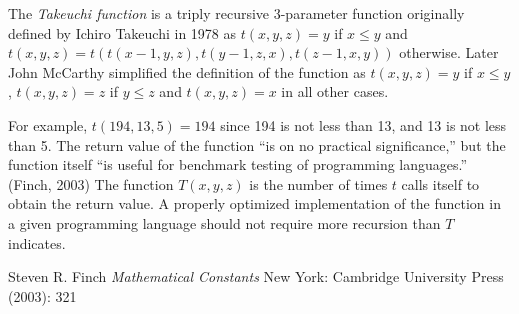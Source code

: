 \documentclass[12pt]{article}
\begin{document}
The {\em Takeuchi function} is a triply recursive 3-parameter function originally defined by Ichiro Takeuchi in 1978 as $t(x, y, z) = y$ if $x \leq y$ and $t(x, y, z) = t(t(x - 1, y, z), t(y - 1, z, x), t(z - 1, x, y))$ otherwise. Later John McCarthy simplified the definition of the function as $t(x, y, z) = y$ if $x \leq y$, $t(x, y, z) = z$ if $y \leq z$ and $t(x, y, z) = x$ in all other cases.

For example, $t(194, 13, 5) = 194$ since 194 is not less than 13, and 13 is not less than 5. The return value of the function ``is on no practical significance,'' but the function itself ``is useful for benchmark testing of programming languages.'' (Finch, 2003) The function $T(x, y, z)$ is the number of times $t$ calls itself to obtain the return value. A properly optimized implementation of the function in a given programming language should not require more recursion than $T$ indicates.

\begin{thebibliography}{1}
 Steven R. Finch {\it Mathematical Constants} New York: Cambridge University Press (2003): 321
\end{thebibliography}
\end{document}
